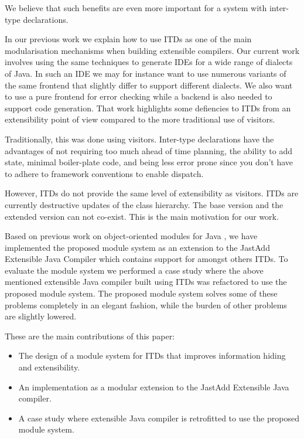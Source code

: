 We believe that such benefits are even more important for a system with
inter-type declarations. 




In our previous work we explain how to use ITDs as one of the main
modularisation mechanisms when building extensible compilers. Our current
work involves using the same techniques to generate IDEs for a wide range
of dialects of Java. In such an IDE we may for instance want to use numerous variants of the
same frontend that slightly differ to support different dialects. We also
want to use a pure frontend for error checking while a backend is also
needed to support code generation.
That work highlights some defiencies to ITDs from an extensibility point of
view compared to the more traditional use of visitors.

Traditionally, this was done using visitors. Inter-type declarations have the advantages of
not requiring too much ahead of time planning, the ability to add state, minimal boiler-plate code, 
and being less error prone since you don't have to adhere to framework conventions to enable dispatch.

However, ITDs do not provide the same level of extensibility as visitors.
ITDs are currently destructive updates of the class hierarchy. The base version and the
extended version can not co-exist. This is the main motivation for our
work. 

Based on previous work on object-oriented modules for Java \cite{modulesastypes}, 
we have implemented the proposed module system as an extension to the
JastAdd Extensible Java Compiler which contains support for amongst others
ITDs. 
To evaluate the module system we performed a case study where the above
mentioned extensible Java compiler built using ITDs was refactored to use
the proposed module system.
The proposed module system solves some of these problems completely in an
elegant fashion, while the burden of other problems are slightly lowered.

These are the main contributions of this paper:
\begin{itemize}
\item The design of a module system for ITDs that improves information
hiding and extensibility.
\item An implementation as a modular extension to the JastAdd Extensible
Java compiler.
\item A case study where extensible Java compiler is retrofitted to use the
proposed module system.
\end{itemize}

